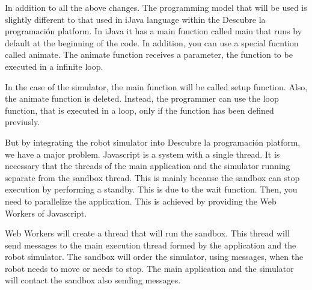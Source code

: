 In addition to all the above changes. The programming model that will be used is slightly different to that used in iJava language within the Descubre la programación platform. In iJava it has a main function called main that runs by default at the beginning of the code. In addition, you can use a special fucntion called animate. The animate function receives a parameter, the function to be executed in a infinite loop.

In the case of the simulator, the main function will be called setup function. Also, the animate function is deleted. Instead, the programmer can use the loop function, that is executed in a loop, only if the function has been defined previusly.


%
%

But by integrating the robot simulator into Descubre la programación platform, we have a major problem. Javascript is a system with a single thread. It is necessary that the threads of the main application and the simulator running separate from the sandbox thread. This is mainly because the sandbox can stop execution by performing a standby. This is due to the wait function. Then, you need to parallelize the application. This is achieved by providing the Web Workers of Javascript.

Web Workers will create a thread that will run the sandbox. This thread will send messages to the main execution thread formed by the application and the robot simulator. The sandbox will order the simulator, using messages, when the robot needs to move or needs to stop. The main application and the simulator will contact the sandbox also sending messages.



